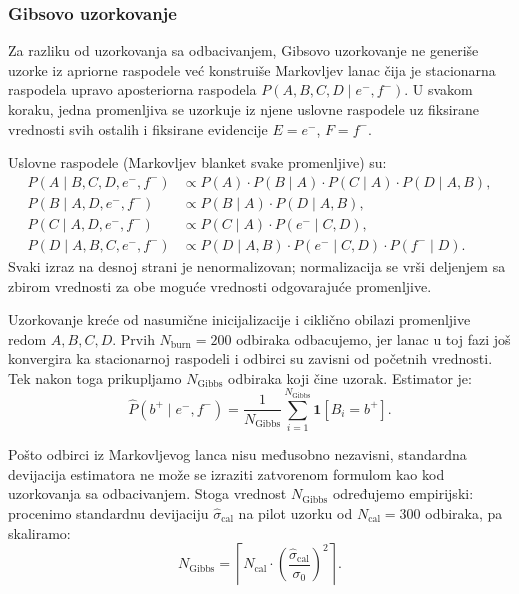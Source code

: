 \documentclass[12pt,a4paper]{article}
\begin{document}
\subsubsection*{Gibsovo uzorkovanje}

Za razliku od uzorkovanja sa odbacivanjem, Gibsovo uzorkovanje ne generiše uzorke iz
apriorne raspodele već konstruiše Markovljev lanac čija je stacionarna raspodela upravo
aposteriorna raspodela $P(A,B,C,D\mid e^-,f^-)$. U svakom koraku, jedna promenljiva
se uzorkuje iz njene uslovne raspodele uz fiksirane vrednosti svih ostalih i fiksirane
evidencije $E=e^-$, $F=f^-$.

Uslovne raspodele (Markovljev blanket svake promenljive) su:
\begin{align*}
  P(A \mid B,C,D,e^-,f^-) &\propto P(A)\cdot P(B\mid A)\cdot P(C\mid A)\cdot P(D\mid A,B),\\
  P(B \mid A,D,e^-,f^-)   &\propto P(B\mid A)\cdot P(D\mid A,B),\\
  P(C \mid A,D,e^-,f^-)   &\propto P(C\mid A)\cdot P(e^-\mid C,D),\\
  P(D \mid A,B,C,e^-,f^-) &\propto P(D\mid A,B)\cdot P(e^-\mid C,D)\cdot P(f^-\mid D).
\end{align*}
Svaki izraz na desnoj strani je nenormalizovan; normalizacija se vrši deljenjem sa zbirom
vrednosti za obe moguće vrednosti odgovarajuće promenljive.

Uzorkovanje kreće od nasumične inicijalizacije i ciklično obilazi promenljive redom $A, B, C, D$.
Prvih $N_\mathrm{burn} = 200$ odbiraka odbacujemo, jer lanac u toj fazi još konvergira ka
stacionarnoj raspodeli i odbirci su zavisni od početnih vrednosti. Tek nakon toga prikupljamo
$N_\mathrm{Gibbs}$ odbiraka koji čine uzorak. Estimator je:
\[
  \hat{P}(b^+\mid e^-,f^-) = \frac{1}{N_\mathrm{Gibbs}}\sum_{i=1}^{N_\mathrm{Gibbs}}
  \mathbf{1}[B_i = b^+].
\]

Pošto odbirci iz Markovljevog lanca nisu međusobno nezavisni, standardna devijacija
estimatora ne može se izraziti zatvorenom formulom kao kod uzorkovanja sa odbacivanjem.
Stoga vrednost $N_\mathrm{Gibbs}$ određujemo empirijski: procenimo standardnu devijaciju
$\hat{\sigma}_\mathrm{cal}$ na pilot uzorku od $N_\mathrm{cal} = 300$ odbiraka, pa skaliramo:
\[
  N_\mathrm{Gibbs} = \left\lceil N_\mathrm{cal}\cdot
  \left(\frac{\hat{\sigma}_\mathrm{cal}}{\sigma_0}\right)^{\!2} \right\rceil.
\]

\end{document}
